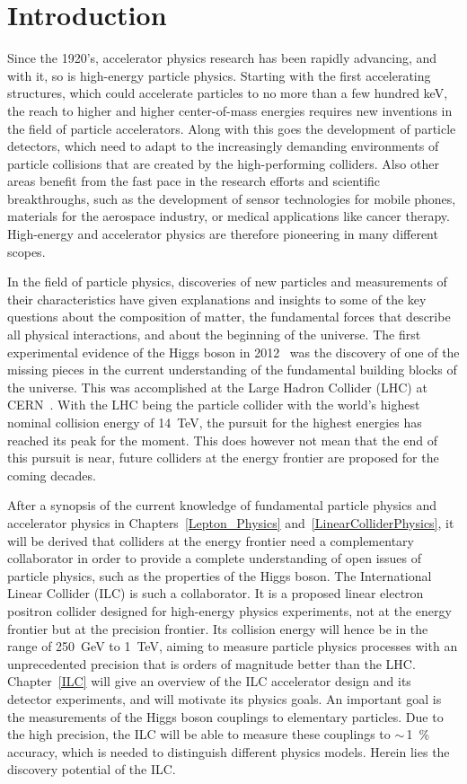 \chapter{Introduction}
\label{Introduction}
Since the 1920's, accelerator physics research has been rapidly advancing, and with it, so is high-energy particle physics.
Starting with the first accelerating structures, which could accelerate particles to no more than a few hundred \si{\keV}, the reach to higher and higher center-of-mass energies requires new inventions in the field of particle accelerators.
Along with this goes the development of particle detectors, which need to adapt to the increasingly demanding environments of particle collisions that are created by the high-performing colliders.
Also other areas benefit from the fast pace in the research efforts and scientific breakthroughs, such as the development of sensor technologies for mobile phones, materials for the aerospace industry, or medical applications like cancer therapy.
High-energy and accelerator physics are therefore pioneering in many different scopes.

In the field of particle physics, discoveries of new particles and measurements of their characteristics have given explanations and insights to some of the key questions about the composition of matter, the fundamental forces that describe all physical interactions, and about the beginning of the universe.
The first experimental evidence of the Higgs boson in 2012~\cite{Higgs,Higgs2} was the discovery of one of the missing pieces in the current understanding of the fundamental building blocks of the universe.
This was accomplished at the Large Hadron Collider (LHC) at CERN~\cite{LHC_CERN}.
With the LHC being the particle collider with the world's highest nominal collision energy of \SI{14}{\TeV}, the pursuit for the highest energies has reached its peak for the moment.
This does however not mean that the end of this pursuit is near, future colliders at the energy frontier are proposed for the coming decades.

After a synopsis of the current knowledge of fundamental particle physics and accelerator physics in Chapters~\ref{Lepton_Physics} and~\ref{LinearColliderPhysics}, it will be derived that colliders at the energy frontier need a complementary collaborator in order to provide a complete understanding of open issues of particle physics, such as the properties of the Higgs boson.
The International Linear Collider (ILC) is such a collaborator.
It is a proposed linear electron positron collider designed for high-energy physics experiments, not at the energy frontier but at the precision frontier.
Its collision energy will hence be in the range of \SI{250}{\GeV} to \SI{1}{\TeV}, aiming to measure particle physics processes with an unprecedented precision that is orders of magnitude better than the LHC.
Chapter~\ref{ILC} will give an overview of the ILC accelerator design and its detector experiments, and will motivate its physics goals.
An important goal is the measurements of the Higgs boson couplings to elementary particles.
Due to the high precision, the ILC will be able to measure these couplings to $\sim$\,\SI{1}{\percent} accuracy, which is needed to distinguish different physics models.
Herein lies the discovery potential of the ILC.

